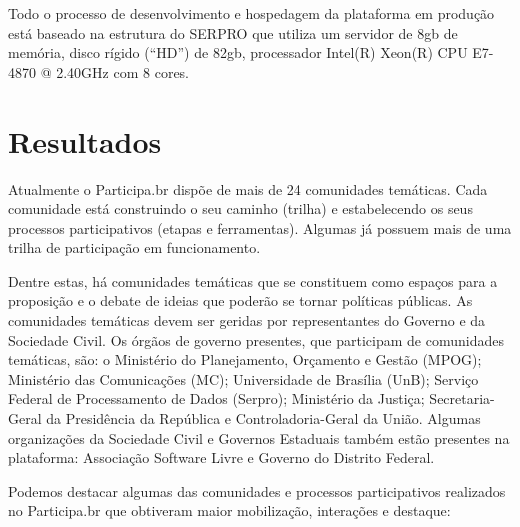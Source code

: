 \documentclass{article}
\begin{document}
Todo o processo de desenvolvimento e hospedagem da plataforma em produção
está  baseado na estrutura do SERPRO que utiliza um servidor de 8gb de
memória, disco rígido (``HD'') de 82gb, processador Intel(R) Xeon(R) CPU E7-
4870 @ 2.40GHz com 8 cores.
 
\section{Resultados}


Atualmente o Participa.br dispõe de mais de 24 comunidades temáticas. Cada
comunidade está construindo o seu caminho (trilha) e estabelecendo os seus
processos participativos (etapas e ferramentas). Algumas já possuem mais de uma
trilha de participação em funcionamento.

Dentre estas, há comunidades temáticas que se constituem como espaços para a
proposição e o debate de ideias que poderão se tornar políticas públicas. As
comunidades temáticas devem ser geridas por representantes do Governo e da
Sociedade Civil. Os órgãos de governo presentes, que participam de comunidades
temáticas, são: o  Ministério do Planejamento, Orçamento e Gestão (MPOG);
Ministério das Comunicações (MC); Universidade de Brasília (UnB); Serviço
Federal de Processamento de Dados (Serpro); Ministério da Justiça;
Secretaria-Geral da Presidência da República e Controladoria-Geral da União.
Algumas organizações da Sociedade Civil e Governos Estaduais também estão
presentes na plataforma: Associação Software Livre e Governo do Distrito
Federal.

Podemos destacar algumas das comunidades e processos participativos realizados
no Participa.br que obtiveram maior mobilização, interações e destaque:
\end{document}
